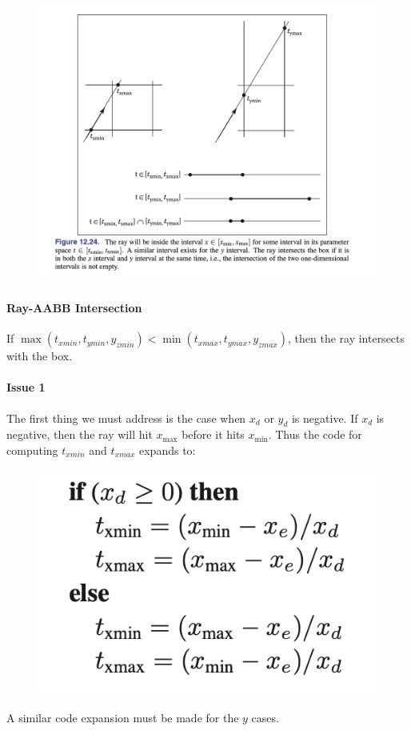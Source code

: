 \documentclass[11pt]{article}
\numberwithin{equation}{section}
\begin{document}
	\begin{figure}[H]
	\centering
	\includegraphics[scale=0.45]{p7}
	\end{figure}
\paragraph{Ray-AABB Intersection}
If $\max(t_{xmin}, t_{ymin}, y_{zmin}) < \min(t_{xmax}, t_{ymax}, y_{zmax})$, then the ray intersects with the box.

\paragraph{Issue 1}
The first thing we must address is the case when $x_d$ or $y_d$ is negative. If $x_d$ is negative, then the ray will hit $x_{\max}$ before it hits $x_{\min}$. Thus the code for computing $t_{xmin}$ and $t_{xmax}$ expands to:
	\begin{figure}[H]
	\centering
	\includegraphics[scale=0.7]{p8}
	\end{figure}
A similar code expansion must be made for the $y$ cases.
	
\end{document}
